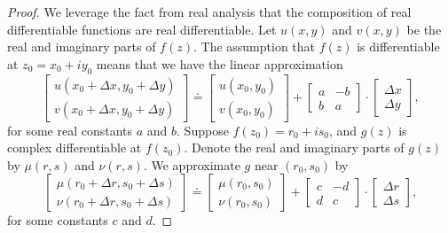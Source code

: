 \begin{proof}
We leverage the fact from real analysis that the composition of real differentiable functions are real differentiable. Let $u(x,y)$ and $ v(x,y)$ be the real and imaginary parts of $f(z)$. The assumption that $f(z)$ is differentiable at $z_0 = x_0+iy_0$ means that we have the linear approximation
$$
	\begin{bmatrix} u(x_0+\Delta x, y_0+\Delta y) \\ v(x_0+\Delta x, y_0 + \Delta y) \end{bmatrix} 
\doteq
\begin{bmatrix} u(x_0,y_0) \\ v(x_0,y_0) \end{bmatrix}	+
\begin{bmatrix}
a & -b \\ b & a
\end{bmatrix} \cdot
\begin{bmatrix} \Delta x \\ \Delta y \end{bmatrix},
$$
for some real constants $a$ and $b$. Suppose $f(z_0) = r_0 + i s_0$, and $g(z)$ is complex differentiable at $f(z_0)$. Denote the real and imaginary parts of $g(z)$ by $\mu(r,s)$ and $\nu(r,s)$. We approximate $g$ near $(r_0,s_0)$ by
$$
\begin{bmatrix} \mu(r_0+\Delta r, s_0+\Delta s) \\ \nu(r_0+\Delta r, s_0 + \Delta s) \end{bmatrix} 
\doteq
\begin{bmatrix} \mu(r_0,s_0) \\ \nu(r_0,s_0) \end{bmatrix}	+
\begin{bmatrix}
	c & -d \\ d & c
\end{bmatrix} \cdot
\begin{bmatrix} \Delta r \\ \Delta s \end{bmatrix},
$$
for some constants $c$ and $d$. 


\end{proof}
